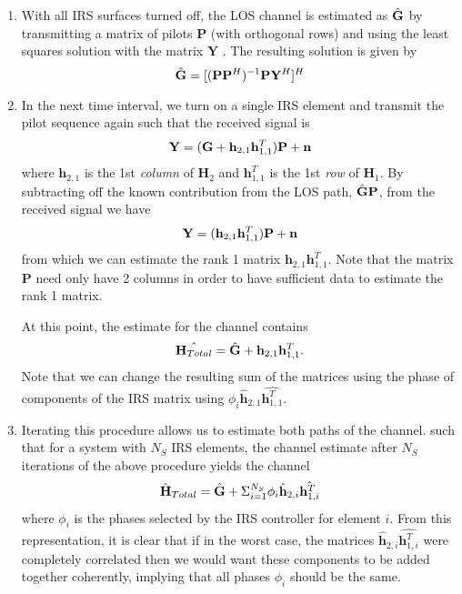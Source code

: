 \documentclass[12pt,a4paper]{report}
\begin{document}
	\begin{enumerate}
	\item
		With all IRS surfaces turned off, the LOS channel is estimated as $\hat{\mathbf{G}}$ by 
		transmitting a matrix of pilots $\mathbf{P}$ (with orthogonal rows)  and using the least squares solution with the matrix $\mathbf{Y}$ \cite{nadeem2019intelligent}.
		The resulting solution is given by
		\begin{equation}
			\hat{\mathbf{G}} = [(\mathbf{P} \mathbf{P}^H)^{-1} \mathbf{P} \mathbf{Y}^H]^H
		\end{equation}
			
	\item 	
		In the next time interval, we turn on a single IRS element and transmit the pilot sequence again such that the received signal is 
			\begin{equation*}
			\mathbf{Y} = (\mathbf{G} + \mathbf{h}_{2,1}\mathbf{h}^T_{1,1}  )\mathbf{P}  + \mathbf{n}
			\end{equation*}
			where $\mathbf{h}_{2,1}$ is the 1st \emph{column} of $ \mathbf{H}_{2}$ and $\mathbf{h}_{1,1}^T$  is the 1st \emph{row} of $\mathbf{H}_{1}$.
			By subtracting off the known contribution from the LOS path, $\hat{\mathbf{G}}\mathbf{P}$, from the received signal we have 
						\begin{equation*}
						\mathbf{Y} = (\mathbf{h}_{2,1}\mathbf{h}^T_{1,1})\mathbf{P}  + \mathbf{n}
						\end{equation*}
			from which we can estimate the rank 1 matrix $\mathbf{h}_{2,1}\mathbf{h}^T_{1,1}$.
			Note that the matrix $\mathbf{P} $ need only have 2 columns in order to have sufficient data to estimate the rank 1 matrix.
			\par
			At this point, the estimate for the channel contains
				\begin{equation*}
				\hat{\mathbf{H}_{Total}} = \hat{\mathbf{G}} + \mathbf{h}_{2,1}\mathbf{h}^T_{1,1}.
				\end{equation*}
				Note that we can change the resulting sum of the matrices using the phase of components of the IRS matrix using  $\phi_i \hat{\mathbf{h}}_{2,1}\hat{\mathbf{h}^T_{1,1}} $.
	\item 
		Iterating this procedure allows us to estimate both paths of the channel. 
		such that for a system with $N_S$ IRS elements, the channel estimate after $N_S$ iterations of the above procedure yields the channel 
				\begin{equation*}
				\hat{\mathbf{H}}_{Total} = \hat{\mathbf{G}} + \Sigma_{i=1}^{N_S} \phi_i \hat{\mathbf{h}}_{2,i}\hat{\mathbf{h}^T_{1,i}} 
				\end{equation*}
				where $\phi_i$ is the phases selected by the IRS controller for element $i$. 
		From this representation, it is clear that if in the worst case, the matrices $\hat{\mathbf{h}}_{2,i}\hat{\mathbf{h}^T_{1,i}}$ were completely correlated
		then we would want these components to be added together coherently, implying that all phases $\phi_i$ should be the same.
	\end{enumerate}
	
\end{document}
